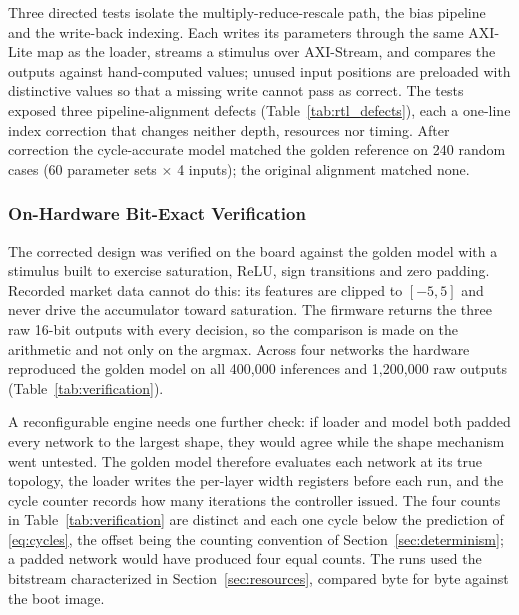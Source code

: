 \documentclass[pdflatex,sn-mathphys-num,iicol]{sn-jnl}
\begin{document}
Three directed tests isolate the multiply-reduce-rescale path, the bias pipeline
and the write-back indexing. Each writes its parameters through the same
AXI-Lite map as the loader, streams a stimulus over AXI-Stream, and compares
the outputs against hand-computed values; unused input positions are preloaded
with distinctive values so that a missing write cannot pass as correct. The
tests exposed three pipeline-alignment defects (Table~\ref{tab:rtl_defects}),
each a one-line index correction that changes neither depth, resources nor
timing. After correction the cycle-accurate model matched the golden reference
on 240 random cases (60 parameter sets $\times$ 4 inputs); the original
alignment matched none.

\subsubsection{On-Hardware Bit-Exact Verification}
The corrected design was verified on the board against the golden model with a
stimulus built to exercise saturation, ReLU, sign transitions and zero padding.
Recorded market data cannot do this: its features are clipped to $[-5,5]$ and
never drive the accumulator toward saturation. The firmware returns the three
raw 16-bit outputs with every decision, so the comparison is made on the
arithmetic and not only on the argmax. Across four networks the hardware
reproduced the golden model on all 400{,}000 inferences and 1{,}200{,}000 raw
outputs (Table~\ref{tab:verification}).

A reconfigurable engine needs one further check: if loader and model both
padded every network to the largest shape, they would agree while the shape
mechanism went untested. The golden model therefore evaluates each network at
its true topology, the loader writes the per-layer width registers before each
run, and the cycle counter records how many iterations the controller issued.
The four counts in Table~\ref{tab:verification} are distinct and each one cycle
below the prediction of \eqref{eq:cycles}, the offset being the counting
convention of Section~\ref{sec:determinism}; a padded network would have
produced four equal counts. The runs used the bitstream characterized in
Section~\ref{sec:resources}, compared byte for byte against the boot image.
\end{document}
